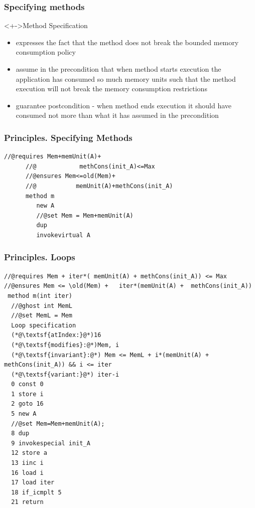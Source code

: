\documentclass{beamer}
\begin{document}
\begin{frame} \frametitle{Specifying methods}
  \begin{block}<+->{Method Specification}
    \begin{itemize}
      \item  <1->{ expresses the fact that the method does not break the bounded memory consumption policy }
      
      \item  <2->{  assume in the precondition that  when method starts execution the application has consumed so much memory units such that the method execution 
 will not break the memory consumption restrictions}
      \item  <3->{ guarantee postcondition -  when method ends execution it should have consumed not more than what it has assumed in the precondition  }
     \end{itemize}
  \end{block}
\end{frame}

\begin{frame}\frametitle{Principles. Specifying Methods}
  \begin{Example}{
      \begin{lstlisting}[language=jvmis]
      //@requires Mem+memUnit(A)+
      //@            methCons(init_A)<=Max
      //@ensures Mem<=old(Mem)+
      //@           memUnit(A)+methCons(init_A)
      method m
         new A
         //@set Mem = Mem+memUnit(A)
         dup
         invokevirtual A
      \end{lstlisting}         
       }
  \end{Example} 
\end{frame}


\begin{frame}\frametitle{Principles. Loops}
 \begin{Example}{ {\tiny 
 \begin{lstlisting}[language=jvmis]
//@requires Mem + iter*( memUnit(A) + methCons(init_A)) <= Max
//@ensures Mem <= \old(Mem) +   iter*(memUnit(A) +  methCons(init_A))   
 method m(int iter)
  //@ghost int MemL
  //@set MemL = Mem
  Loop specification
  (*@\textsf{atIndex:}@*)16
  (*@\textsf{modifies}:@*)Mem, i
  (*@\textsf{invariant}:@*) Mem <= MemL + i*(memUnit(A) + methCons(init_A)) && i <= iter
  (*@\textsf{variant:}@*) iter-i
  0 const 0
  1 store i
  2 goto 16 
  5 new A
  //@set Mem=Mem+memUnit(A);
  8 dup
  9 invokespecial init_A
  12 store a
  13 iinc i
  16 load i
  17 load iter
  18 if_icmplt 5 
  21 return
 \end{lstlisting}}  
}\end{Example} 
\end{frame}
\end{document}
